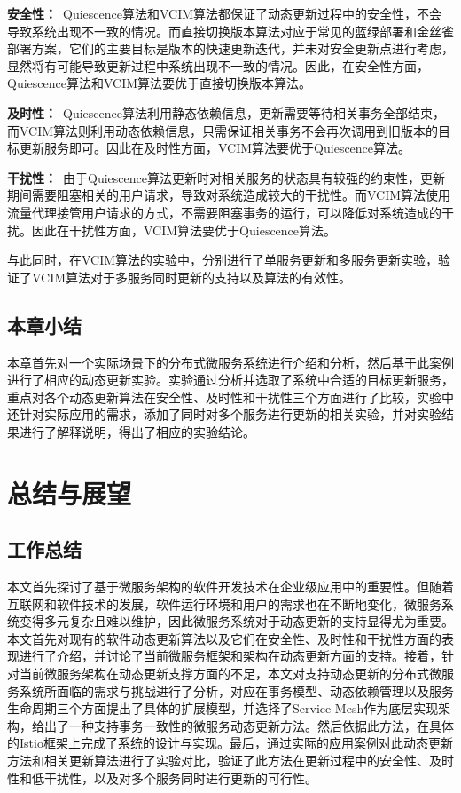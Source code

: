 \documentclass[macfonts,master]{njuthesis}
\begin{document}
\textbf{安全性：}~Quiescence算法和VCIM算法都保证了动态更新过程中的安全性，不会导致系统出现不一致的情况。而直接切换版本算法对应于常见的蓝绿部署和金丝雀部署方案，它们的主要目标是版本的快速更新迭代，并未对安全更新点进行考虑，显然将有可能导致更新过程中系统出现不一致的情况。因此，在安全性方面，Quiescence算法和VCIM算法要优于直接切换版本算法。

\textbf{及时性：}~Quiescence算法利用静态依赖信息，更新需要等待相关事务全部结束，而VCIM算法则利用动态依赖信息，只需保证相关事务不会再次调用到旧版本的目标更新服务即可。因此在及时性方面，VCIM算法要优于Quiescence算法。

\textbf{干扰性：}~由于Quiescence算法更新时对相关服务的状态具有较强的约束性，更新期间需要阻塞相关的用户请求，导致对系统造成较大的干扰性。而VCIM算法使用流量代理接管用户请求的方式，不需要阻塞事务的运行，可以降低对系统造成的干扰。因此在干扰性方面，VCIM算法要优于Quiescence算法。

与此同时，在VCIM算法的实验中，分别进行了单服务更新和多服务更新实验，验证了VCIM算法对于多服务同时更新的支持以及算法的有效性。

\section{本章小结}
本章首先对一个实际场景下的分布式微服务系统进行介绍和分析，然后基于此案例进行了相应的动态更新实验。实验通过分析并选取了系统中合适的目标更新服务，重点对各个动态更新算法在安全性、及时性和干扰性三个方面进行了比较，实验中还针对实际应用的需求，添加了同时对多个服务进行更新的相关实验，并对实验结果进行了解释说明，得出了相应的实验结论。

\chapter{总结与展望}\label{chapter_concludesion}

\section{工作总结}
本文首先探讨了基于微服务架构的软件开发技术在企业级应用中的重要性。但随着互联网和软件技术的发展，软件运行环境和用户的需求也在不断地变化，微服务系统变得多元复杂且难以维护，因此微服务系统对于动态更新的支持显得尤为重要。本文首先对现有的软件动态更新算法以及它们在安全性、及时性和干扰性方面的表现进行了介绍，并讨论了当前微服务框架和架构在动态更新方面的支持。接着，针对当前微服务架构在动态更新支撑方面的不足，本文对支持动态更新的分布式微服务系统所面临的需求与挑战进行了分析，对应在事务模型、动态依赖管理以及服务生命周期三个方面提出了具体的扩展模型，并选择了Service Mesh作为底层实现架构，给出了一种支持事务一致性的微服务动态更新方法。然后依据此方法，在具体的Istio框架上完成了系统的设计与实现。最后，通过实际的应用案例对此动态更新方法和相关更新算法进行了实验对比，验证了此方法在更新过程中的安全性、及时性和低干扰性，以及对多个服务同时进行更新的可行性。
\end{document}
